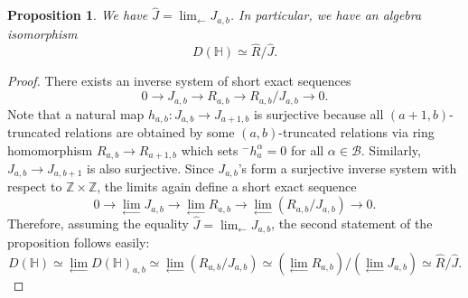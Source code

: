 \documentclass[10pt]{amsart}
\newcommand{\BZ}{\mathbb{Z}}
\newcommand{\BH}{\mathbb{H}}
\newcommand{\CB}{\mathcal{B}}
\newcommand{\+}{{}^+}
\newtheorem {proposition}[theorem]{Proposition}
\theoremstyle{definition}
\theoremstyle {definition}
\theoremstyle {definition}
\begin{document}
\begin{proposition}
    We have $\displaystyle \widehat J= \lim_{\longleftarrow} J_{a,b}$. In particular, we have an algebra isomorphism 
    $$D(\BH)\simeq \widehat R/\widehat J.
    $$
\end{proposition}
\begin{proof}
There exists an inverse system of short exact sequences
$$0\rightarrow J_{a,b}\rightarrow R_{a,b}\rightarrow R_{a,b}/J_{a,b}\rightarrow 0.
$$
Note that a natural map $h_{a,b}:J_{a,b}\rightarrow J_{a+1,b}$ is surjective because all $(a+1,b)$-truncated relations are obtained by some $(a,b)$-truncated relations via ring homomorphism $R_{a,b}\rightarrow R_{a+1,b}$ which sets ${}^{-}h_a^\alpha=0$ for all $\alpha\in \CB$. Similarly, $J_{a,b}\rightarrow J_{a,b+1}$ is also surjective. Since $J_{a,b}$'s form a surjective inverse system with respect to $\BZ\times\BZ$, the limits again define a short exact sequence
$$0\rightarrow \lim_{\longleftarrow}J_{a,b}\rightarrow \lim_{\longleftarrow}R_{a,b}\rightarrow \lim_{\longleftarrow}(R_{a,b}/J_{a,b})\rightarrow 0.
$$
Therefore, assuming the equality $\displaystyle \widehat J= \lim_{\longleftarrow} J_{a,b}$, the second statement of the proposition follows easily:
$$D(\BH)\simeq\lim_{\longleftarrow} D(\BH)_{a,b}\simeq \lim_{\longleftarrow} (R_{a,b}/J_{a,b})\simeq (\lim_{\longleftarrow}R_{a,b})/(\lim_{\longleftarrow}J_{a,b})\simeq \widehat{R}/\widehat{J}.
$$


\end{proof}
\end{document}
